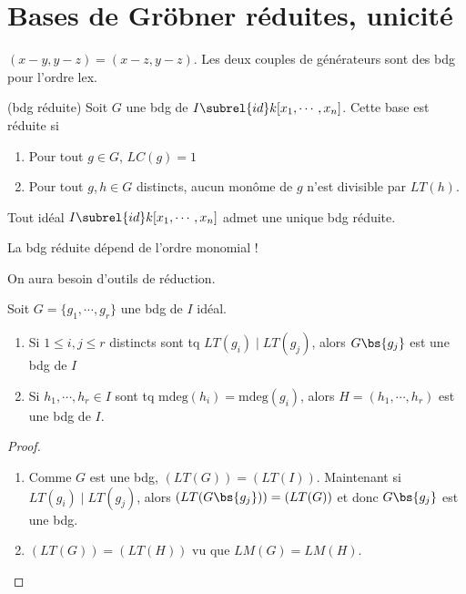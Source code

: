     \section{Bases de Gröbner réduites, unicité}
        \begin{expl}
            $(x-y,y-z) = (x-z, y-z)$. Les deux couples de générateurs sont des bdg pour l'ordre lex.
        \end{expl}
        \begin{defi} (bdg réduite)
            Soit $G$ une bdg de $I \subrel{id} k[x_1, \cdots, x_n]$. Cette base est réduite si
            \begin{enumerate}
                \item Pour tout $g \in G$, $LC(g) = 1$
                \item Pour tout $g,h \in G$ distincts, aucun monôme de $g$ n'est divisible par $LT(h)$.
            \end{enumerate}
        \end{defi}
        \begin{theo}
            \label{1.5.1}
            Tout idéal $I \subrel{id} k[x_1, \cdots, x_n]$ admet une unique bdg réduite.
        \end{theo}
        \begin{remq}
            La bdg réduite dépend de l'ordre monomial !
        \end{remq}
        On aura besoin d'outils de réduction.
        \begin{lemm}
            Soit $G = \{g_1, \cdots, g_r\}$ une bdg de $I$ idéal.
            \begin{enumerate}
                \item Si $1 \leq i,j \leq r$ distincts sont tq $LT(g_i) \mid LT(g_j)$, alors $G \bs \{g_j\}$ est une bdg de $I$
                \item Si $h_1, \cdots, h_r \in I$ sont tq $\mathrm{mdeg}(h_i) = \mathrm{mdeg}(g_i)$, alors $H = (h_1, \cdots, h_r)$ est une bdg de $I$.
            \end{enumerate}
        \end{lemm}
        \begin{proof}
            \begin{enumerate}
                \item Comme $G$ est une bdg, $(LT(G)) = (LT(I))$. Maintenant si $LT(g_i) \mid LT(g_j)$, alors $(LT(G \bs \{g_j\})) = (LT(G))$ et donc $G \bs \{g_j\}$ est une bdg.
                \item $(LT(G)) = (LT(H))$ vu que $LM(G) = LM(H)$.
            \end{enumerate}
        \end{proof}
